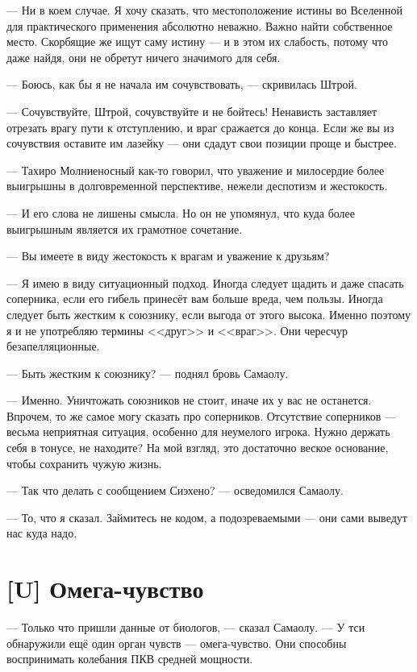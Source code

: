 --- Ни в коем случае.
Я хочу сказать, что местоположение истины во Вселенной для практического применения абсолютно неважно.
Важно найти собственное место.
Скорбящие же ищут саму истину --- и в этом их слабость, потому что даже найдя, они не обретут ничего значимого для себя.

--- Боюсь, как бы я не начала им сочувствовать, --- скривилась Штрой.

--- Сочувствуйте, Штрой, сочувствуйте и не бойтесь!
Ненависть заставляет отрезать врагу пути к отступлению, и враг сражается до конца.
Если же вы из сочувствия оставите им лазейку --- они сдадут свои позиции проще и быстрее.

--- Тахиро Молниеносный как-то говорил, что уважение и милосердие более выигрышны в долговременной перспективе, нежели деспотизм и жестокость.

--- И его слова не лишены смысла.
Но он не упомянул, что куда более выигрышным является их грамотное сочетание.

--- Вы имеете в виду жестокость к врагам и уважение к друзьям?

--- Я имею в виду ситуационный подход.
Иногда следует щадить и даже спасать соперника, если его гибель принесёт вам больше вреда, чем пользы.
Иногда следует быть жестким к союзнику, если выгода от этого высока.
Именно поэтому я и не употребляю термины <<друг>> и <<враг>>.
Они чересчур безапелляционные.

--- Быть жестким к союзнику? --- поднял бровь Самаолу.

--- Именно.
Уничтожать союзников не стоит, иначе их у вас не останется.
Впрочем, то же самое могу сказать про соперников.
Отсутствие соперников --- весьма неприятная ситуация, особенно для неумелого игрока.
Нужно держать себя в тонусе, не находите?
На мой взгляд, это достаточно веское основание, чтобы сохранить чужую жизнь.

--- Так что делать с сообщением Сиэхено? --- осведомился Самаолу.

--- То, что я сказал.
Займитесь не кодом, а подозреваемыми --- они сами выведут нас куда надо.

\section{[U] Омега-чувство}

\textspace

--- Только что пришли данные от биологов, --- сказал Самаолу.
--- У тси обнаружили ещё один орган чувств --- омега-чувство.
Они способны воспринимать колебания ПКВ средней мощности.

